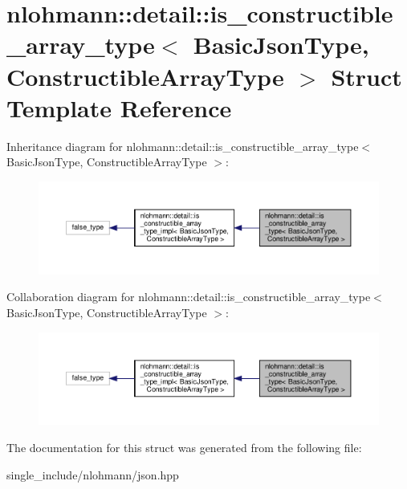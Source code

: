 \hypertarget{structnlohmann_1_1detail_1_1is__constructible__array__type}{}\section{nlohmann\+:\+:detail\+:\+:is\+\_\+constructible\+\_\+array\+\_\+type$<$ Basic\+Json\+Type, Constructible\+Array\+Type $>$ Struct Template Reference}
\label{structnlohmann_1_1detail_1_1is__constructible__array__type}


Inheritance diagram for nlohmann\+:\+:detail\+:\+:is\+\_\+constructible\+\_\+array\+\_\+type$<$ Basic\+Json\+Type, Constructible\+Array\+Type $>$\+:\nopagebreak
\begin{figure}[H]
\begin{center}
\leavevmode
\includegraphics[width=350pt]{structnlohmann_1_1detail_1_1is__constructible__array__type__inherit__graph}
\end{center}
\end{figure}


Collaboration diagram for nlohmann\+:\+:detail\+:\+:is\+\_\+constructible\+\_\+array\+\_\+type$<$ Basic\+Json\+Type, Constructible\+Array\+Type $>$\+:\nopagebreak
\begin{figure}[H]
\begin{center}
\leavevmode
\includegraphics[width=350pt]{structnlohmann_1_1detail_1_1is__constructible__array__type__coll__graph}
\end{center}
\end{figure}


The documentation for this struct was generated from the following file\+:\begin{DoxyCompactItemize}
\item 
single\+\_\+include/nlohmann/json.\+hpp\end{DoxyCompactItemize}
